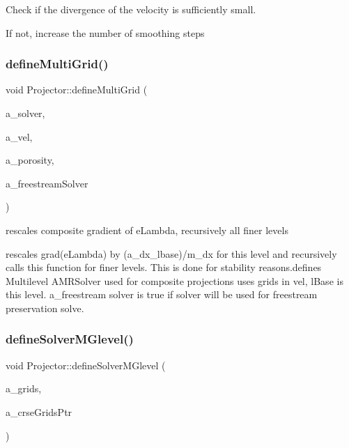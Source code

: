 Check if the divergence of the velocity is sufficiently small. 

If not, increase the number of smoothing steps \mbox{\label{class_projector_a75e907d5ebcf83bdf5c59761578dcf68}} 
\subsubsection{\texorpdfstring{define\+Multi\+Grid()}{defineMultiGrid()}}
{\footnotesize\ttfamily void Projector\+::define\+Multi\+Grid (\begin{DoxyParamCaption}\item[{\textbf{ A\+M\+R\+Multi\+Grid}$<$ \textbf{ Level\+Data}$<$ \textbf{ F\+Array\+Box} $>$ $>$ \&}]{a\+\_\+solver,  }\item[{const \textbf{ Vector}$<$ \textbf{ Level\+Data}$<$ \textbf{ F\+Array\+Box} $>$ $\ast$ $>$ \&}]{a\+\_\+vel,  }\item[{\textbf{ Vector}$<$ \textbf{ Ref\+Counted\+Ptr}$<$ \textbf{ Level\+Data}$<$ \textbf{ Flux\+Box} $>$ $>$ $>$ \&}]{a\+\_\+porosity,  }\item[{bool}]{a\+\_\+freestream\+Solver }\end{DoxyParamCaption})\hspace{0.3cm}{\ttfamily [protected]}}



rescales composite gradient of e\+Lambda, recursively all finer levels 

rescales grad(e\+Lambda) by (a\+\_\+dx\+\_\+lbase)/m\+\_\+dx for this level and recursively calls this function for finer levels. This is done for stability reasons.\+defines Multilevel A\+M\+R\+Solver used for composite projections uses grids in vel, l\+Base is this level. a\+\_\+freestream solver is true if solver will be used for freestream preservation solve. \mbox{\label{class_projector_a328920a24092d06892c154a0910a2d81}} 
\subsubsection{\texorpdfstring{define\+Solver\+M\+Glevel()}{defineSolverMGlevel()}}
{\footnotesize\ttfamily void Projector\+::define\+Solver\+M\+Glevel (\begin{DoxyParamCaption}\item[{const \textbf{ Disjoint\+Box\+Layout} \&}]{a\+\_\+grids,  }\item[{const \textbf{ Disjoint\+Box\+Layout} $\ast$}]{a\+\_\+crse\+Grids\+Ptr }\end{DoxyParamCaption})\hspace{0.3cm}{\ttfamily [protected]}}



